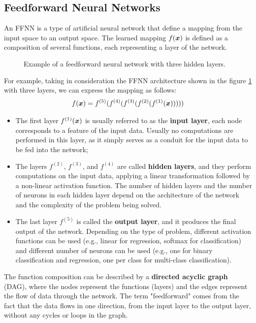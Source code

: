 \subsection{Feedforward Neural Networks}
An FFNN is a type of artificial neural network that define a mapping from the input space to an output space.
The learned mapping $f(\boldsymbol{x})$ is defined as a composition of several functions, each representing a layer of the network.
\begin{figure}[H]
    \centering
    \scalebox{0.8}{
        
    }
    \caption{Example of a feedforward neural network with three hidden layers.}
    \label{fig:FFNN_example}
\end{figure}

For example, taking in consideration the FFNN architecture shown in the figure \ref{fig:FFNN_example} with three layers, we can express the mapping as follows:
\begin{equation*}
    f(\boldsymbol{x}) = f^{(5)}(f^{(4)}(f^{(3)}(f^{(2)}(f^{(1)}(\boldsymbol{x})))))
\end{equation*}
\begin{itemize}
    \item The first layer $f^{(1)}(\boldsymbol{x})$ is usually referred to as the \textbf{input layer}, each node corresponds to a feature of the input data. Usually no
    computations are performed in this layer, as it simply serves as a conduit for the input data to be fed into the network;
    \item The layers $f^{(2)}$, $f^{(3)}$, and $f^{(4)}$ are called \textbf{hidden layers}, and they perform computations on the input data, applying a linear transformation followed by a non-linear activation function.
    The number of hidden layers and the number of neurons in each hidden layer depend on the architecture of the network and the complexity of the problem being solved.
    \item The last layer $f^{(5)}$ is called the \textbf{output layer}, and it produces the final output of the network. Depending on the type of problem,
    different activation functions can be used (e.g., linear for regression, softmax for classification)
    and different number of neurons can be used (e.g., one for binary classification and regression, one per class for multi-class classification).
\end{itemize}
The function composition can be described by a \textbf{directed acyclic graph} (DAG), where the nodes represent the functions (layers) and the edges represent the flow of data through the network. 
The term "feedforward" comes from the fact that the data flows in one direction, from the input layer to the output layer, without any cycles or loops in the graph.

